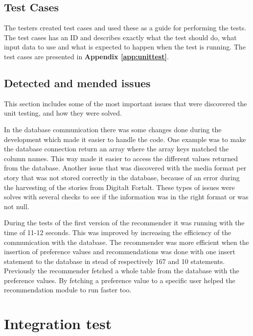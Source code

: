 \subsection{Test Cases}
The testers created test cases and used these as a guide for performing the tests. The test cases has an ID and describes exactly what the test should do, what input data to use and what is expected to happen when the test is running. The test cases are presented in \textbf{Appendix \ref{app:unittest}}.

\subsection{Detected and mended issues}
This section includes some of the most important issues that were discovered the unit testing, and how they were solved. 

In the database communication there was some changes done during the development which made it easier to handle the code. One example was to make the database connection return an array where the array keys matched the column names. This way made it easier to access the different values returned from the database.  
Another issue that was discovered with the media format per story that was not stored correctly in the database, because of an error during the harvesting of the stories from Digitalt Fortalt. These types of issues were solves with several checks to see if the information was in the right format or was not null. 

During the tests of the first version of the recommender it was running with the time of 11-12 seconds. This was improved by increasing the efficiency of the communication with the database. The recommender was more efficient when the insertion of preference values and recommendations was done with one insert statement to the database in stead of respectively 167 and 10 statements. Previously the recommender fetched a whole table from the database with the preference values. By fetching a preference value to a specific user helped the recommendation module to run faster too.




\section{Integration test}
\label{sec:integration_testing}

